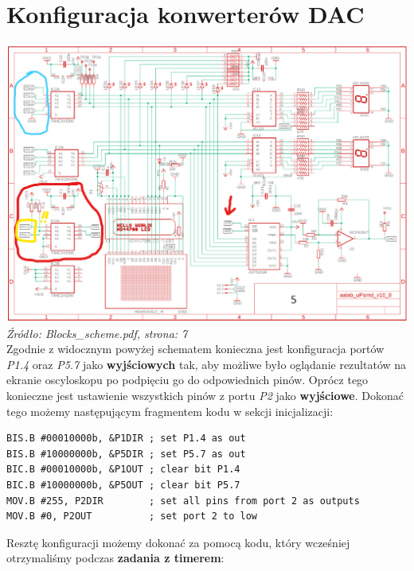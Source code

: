 \documentclass{article}
\begin{document}
\section{Konfiguracja konwerterów DAC}
\includegraphics[width=\textwidth]{"../adc_img/Blocks_scheme_7.png"}
\textit{Źródło: Blocks\_scheme.pdf, strona: 7}
\vspace{3mm} \\
Zgodnie z widocznym powyżej schematem konieczna jest konfiguracja portów \textit{P1.4} oraz \textit{P5.7} jako \textbf{wyjściowych} tak, aby możliwe było oglądanie rezultatów na ekranie oscyloskopu po podpięciu go do odpowiednich pinów.
Oprócz tego konieczne jest ustawienie wszystkich pinów z portu \textit{P2} jako \textbf{wyjściowe}.
Dokonać tego możemy następującym fragmentem kodu w sekcji inicjalizacji:
\begin{verbatim}
BIS.B #00010000b, &P1DIR ; set P1.4 as out
BIS.B #10000000b, &P5DIR ; set P5.7 as out
BIC.B #00010000b, &P1OUT ; clear bit P1.4
BIC.B #10000000b, &P5OUT ; clear bit P5.7
MOV.B #255, P2DIR        ; set all pins from port 2 as outputs
MOV.B #0, P2OUT          ; set port 2 to low \end{verbatim}
\newpage
Resztę konfiguracji możemy dokonać za pomocą kodu, który wcześniej otrzymaliśmy podczas \textbf{zadania z timerem}:
\end{document}
